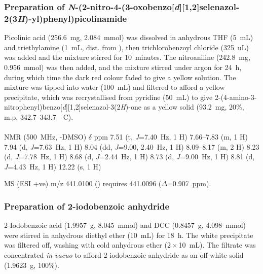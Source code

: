 \begin{refsection}
\subsubsection[Preparation of \refcmpd{ebs-3no2-4nh-2py}]{Preparation of \emph{N}-(2-nitro-4-(3-oxobenzo[\emph{d}][1,2]selenazol-2(3\emph{H})-yl)phenyl)picolinamide }
Picolinic acid (256.6~mg, 2.084~mmol) was dissolved in anhydrous THF (5~mL) and triethylamine (1~mL, dist. from ), then trichlorobenzoyl chloride (325~uL) was added and the mixture stirred for 10~minutes.
The nitroaniline  (242.8~mg, 0.956~mmol) was then added, and the mixture stirred under argon for 24~h, during which time the dark red colour faded to give a yellow solution.
The mixture was tipped into water (100~mL) and filtered to afford a yellow precipitate, which was recrystallised from pyridine (50~mL) to give 2-(4-amino-3-nitrophenyl)benzo[\emph{d}][1,2]selenazol-3(2\emph{H})-one  as a yellow solid (93.2~mg, 20\%, m.p. 342.7--343.7~\degree~C).

\footnotesize\paragraph{}

 NMR (500~MHz, -DMSO) $\delta$ ppm
7.51 (t, \emph{J}=7.40~Hz, 1 H)
7.66--7.83 (m, 1 H)
7.94 (d, \emph{J}=7.63~Hz, 1 H)
8.04 (dd, \emph{J}=9.00, 2.40~Hz, 1 H)
8.09--8.17 (m, 2 H)
8.23 (d, \emph{J}=7.78~Hz, 1 H)
8.68 (d, \emph{J}=2.44~Hz, 1 H)
8.73 (d, \emph{J}=9.00~Hz, 1 H)
8.81 (d, \emph{J}=4.43~Hz, 1 H)
12.22 (s, 1 H)

MS (ESI +ve) m/z 441.0100 ()  requires 441.0096 ($\Delta$=0.907~ppm).

\normalsize

\subsubsection{Preparation of 2-iodobenzoic anhydride }
2-Iodobenzoic acid (1.9957~g, 8.045~mmol) and DCC (0.8457~g, 4.098~mmol) were stirred in anhydrous diethyl ether (10~mL) for 18~h. The white precipitate was filtered off, washing with cold anhydrous ether ($2\times$10~mL). The filtrate was concentrated \emph{in vacuo} to afford 2-iodobenzoic anhydride  as an off-white solid (1.9623~g, 100\%).



\end{refsection}

